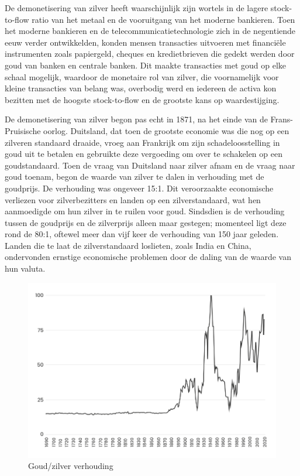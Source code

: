 De demonetisering van zilver heeft waarschijnlijk zijn wortels in de lagere stock-to-flow ratio van het metaal en de vooruitgang van het moderne bankieren. Toen het moderne bankieren en de telecommunicatietechnologie zich in de negentiende eeuw verder ontwikkelden, konden mensen transacties uitvoeren met financiële instrumenten zoals papiergeld, cheques en kredietbrieven die gedekt werden door goud van banken en centrale banken. Dit maakte transacties met goud op elke schaal mogelijk, waardoor de monetaire rol van zilver, die voornamelijk voor kleine transacties van belang was, overbodig werd en iedereen de activa kon bezitten met de hoogste stock-to-flow en de grootste kans op waardestijging.

De demonetisering van zilver begon pas echt in 1871, na het einde van de Frans-Pruisische oorlog. Duitsland, dat toen de grootste economie was die nog op een zilveren standaard draaide, vroeg aan Frankrijk om zijn schadeloosstelling in goud uit te betalen en gebruikte deze vergoeding om over te schakelen op een goudstandaard. Toen de vraag van Duitsland naar zilver afnam en de vraag naar goud toenam, begon de waarde van zilver te dalen in verhouding met de goudprijs. De verhouding was ongeveer 15:1. Dit veroorzaakte economische verliezen voor zilverbezitters en landen op een zilverstandaard, wat hen aanmoedigde om hun zilver in te ruilen voor goud. Sindsdien is de verhouding tussen de goudprijs en de zilverprijs alleen maar gestegen; momenteel ligt deze rond de 80:1, oftewel meer dan vijf keer de verhouding van 150 jaar geleden. Landen die te laat de zilverstandaard loslieten, zoals India en China, ondervonden ernstige economische problemen door de daling van de waarde van hun valuta.

\begin{figure}[!htb]
\centering
    \includegraphics[width=\textwidth]{figures/fig19-1.png}
    \caption[Goud/zilver verhouding]{Goud/zilver verhouding}
    \label{fig19}
\end{figure}

